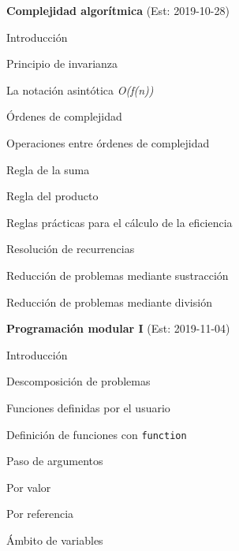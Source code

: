 \begin{longenum}
\begin{longenum}
    \end{longenum}
    \item \textbf{Complejidad algorítmica}  (Est: 2019-10-28)
    \begin{longenum}
        \item Introducción
        \item Principio de invarianza
        \item La notación asintótica \textit{O(f(n))}
        \item Órdenes de complejidad
        \item Operaciones entre órdenes de complejidad
        \begin{longenum}
            \item Regla de la suma
            \item Regla del producto
        \end{longenum}
        \item Reglas prácticas para el cálculo de la eficiencia
        \item Resolución de recurrencias
        \begin{longenum}
            \item Reducción de problemas mediante sustracción
            \item Reducción de problemas mediante división
        \end{longenum}
    \end{longenum}
    \item \textbf{Programación modular I}  (Est: 2019-11-04)
    \begin{longenum}
        \item Introducción
        \begin{longenum}
            \item Descomposición de problemas
        \end{longenum}
        \item Funciones definidas por el usuario
        \begin{longenum}
            \item Definición de funciones con \texttt{function}
            \item Paso de argumentos
            \begin{longenum}
                \item Por valor
                \item Por referencia
            \end{longenum}
            \item Ámbito de variables

\end{longenum}
\end{longenum}
\end{longenum}

